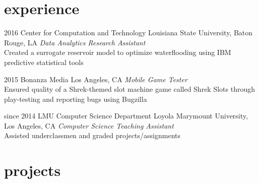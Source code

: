 \documentclass[]{friggeri-cv} %
\begin{document}

\section{experience}

  \begin{entrylist}


    \entry
      {2016}
      {Center for Computation and Technology}
      {Louisiana State University, Baton Rouge, LA}
      {\emph{Data Analytics Research Assistant} \\
	Created a surrogate reservoir model to optimize waterflooding using IBM predictive statistical tools}
	  

    \entry
      {2015}
      {Bonanza Media}
      {Los Angeles, CA}
      {\emph{Mobile Game Tester} \\
	Ensured quality of a Shrek-themed slot machine game called Shrek Slots through play-testing and reporting bugs using Bugzilla}


    \entry
      {since 2014}
      {LMU Computer Science Department}
      {Loyola Marymount University, Los Angeles, CA}
      {\emph{Computer Science Teaching Assistant} \\
        Assisted underclassmen and graded projects/assignments}


\end{entrylist}


\section{projects}
\end{document}
